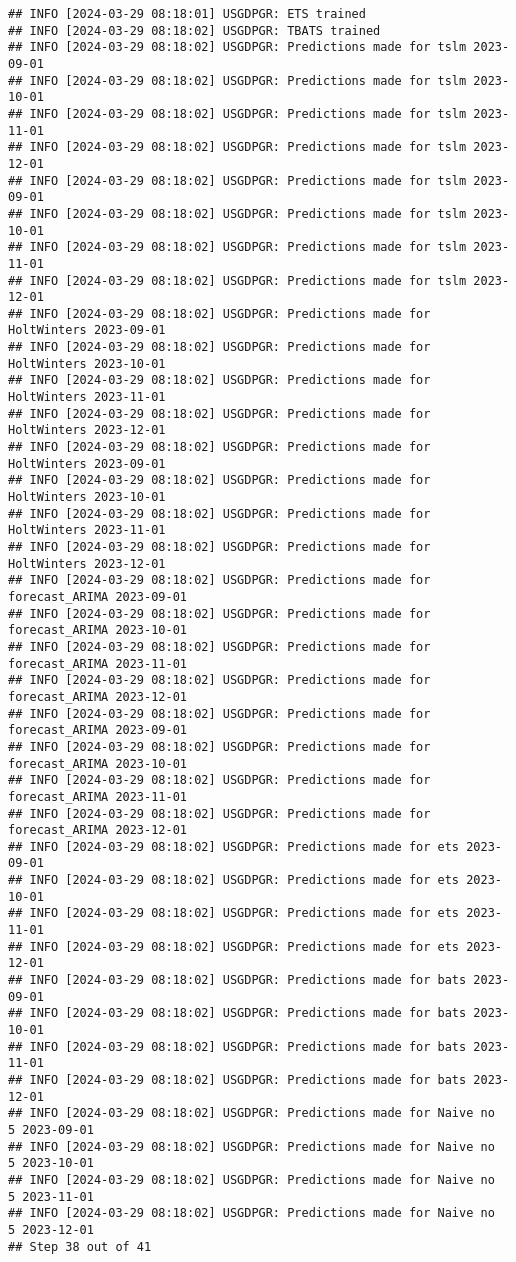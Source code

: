 \documentclass[
]{article}
\begin{document}
\begin{verbatim}
## INFO [2024-03-29 08:18:01] USGDPGR: ETS trained
## INFO [2024-03-29 08:18:02] USGDPGR: TBATS trained
## INFO [2024-03-29 08:18:02] USGDPGR: Predictions made for tslm 2023-09-01
## INFO [2024-03-29 08:18:02] USGDPGR: Predictions made for tslm 2023-10-01
## INFO [2024-03-29 08:18:02] USGDPGR: Predictions made for tslm 2023-11-01
## INFO [2024-03-29 08:18:02] USGDPGR: Predictions made for tslm 2023-12-01
## INFO [2024-03-29 08:18:02] USGDPGR: Predictions made for tslm 2023-09-01
## INFO [2024-03-29 08:18:02] USGDPGR: Predictions made for tslm 2023-10-01
## INFO [2024-03-29 08:18:02] USGDPGR: Predictions made for tslm 2023-11-01
## INFO [2024-03-29 08:18:02] USGDPGR: Predictions made for tslm 2023-12-01
## INFO [2024-03-29 08:18:02] USGDPGR: Predictions made for HoltWinters 2023-09-01
## INFO [2024-03-29 08:18:02] USGDPGR: Predictions made for HoltWinters 2023-10-01
## INFO [2024-03-29 08:18:02] USGDPGR: Predictions made for HoltWinters 2023-11-01
## INFO [2024-03-29 08:18:02] USGDPGR: Predictions made for HoltWinters 2023-12-01
## INFO [2024-03-29 08:18:02] USGDPGR: Predictions made for HoltWinters 2023-09-01
## INFO [2024-03-29 08:18:02] USGDPGR: Predictions made for HoltWinters 2023-10-01
## INFO [2024-03-29 08:18:02] USGDPGR: Predictions made for HoltWinters 2023-11-01
## INFO [2024-03-29 08:18:02] USGDPGR: Predictions made for HoltWinters 2023-12-01
## INFO [2024-03-29 08:18:02] USGDPGR: Predictions made for forecast_ARIMA 2023-09-01
## INFO [2024-03-29 08:18:02] USGDPGR: Predictions made for forecast_ARIMA 2023-10-01
## INFO [2024-03-29 08:18:02] USGDPGR: Predictions made for forecast_ARIMA 2023-11-01
## INFO [2024-03-29 08:18:02] USGDPGR: Predictions made for forecast_ARIMA 2023-12-01
## INFO [2024-03-29 08:18:02] USGDPGR: Predictions made for forecast_ARIMA 2023-09-01
## INFO [2024-03-29 08:18:02] USGDPGR: Predictions made for forecast_ARIMA 2023-10-01
## INFO [2024-03-29 08:18:02] USGDPGR: Predictions made for forecast_ARIMA 2023-11-01
## INFO [2024-03-29 08:18:02] USGDPGR: Predictions made for forecast_ARIMA 2023-12-01
## INFO [2024-03-29 08:18:02] USGDPGR: Predictions made for ets 2023-09-01
## INFO [2024-03-29 08:18:02] USGDPGR: Predictions made for ets 2023-10-01
## INFO [2024-03-29 08:18:02] USGDPGR: Predictions made for ets 2023-11-01
## INFO [2024-03-29 08:18:02] USGDPGR: Predictions made for ets 2023-12-01
## INFO [2024-03-29 08:18:02] USGDPGR: Predictions made for bats 2023-09-01
## INFO [2024-03-29 08:18:02] USGDPGR: Predictions made for bats 2023-10-01
## INFO [2024-03-29 08:18:02] USGDPGR: Predictions made for bats 2023-11-01
## INFO [2024-03-29 08:18:02] USGDPGR: Predictions made for bats 2023-12-01
## INFO [2024-03-29 08:18:02] USGDPGR: Predictions made for Naive no  5 2023-09-01
## INFO [2024-03-29 08:18:02] USGDPGR: Predictions made for Naive no  5 2023-10-01
## INFO [2024-03-29 08:18:02] USGDPGR: Predictions made for Naive no  5 2023-11-01
## INFO [2024-03-29 08:18:02] USGDPGR: Predictions made for Naive no  5 2023-12-01
## Step 38 out of 41
\end{verbatim}
\end{document}
